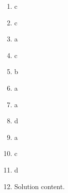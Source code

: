 \documentclass[12pt]{amsart}
\begin{document}
\begin{enumerate}[resume]
\vspace{1cm}
 \end{enumerate}\newpage\newpage{}\graphicspath{{/Users/jilan/Downloads/Randomizer/Randomizer/Sample Course/Sample Assessment/}}\begin{enumerate}\item c\item c\item a\item c\item b\item a\item a\item d\item a\item c\item d\def \a{7}\def \atwoone{1}\def \atwotwo{3}\def \atwothree{4}\def \btwothree{6}\def \sumtwothree{10}\def \diftwothree{-2}\def \bigtwothree{400}\def \powtwothree{1296}\def \logtwothree{0.7737056144690831}\def \factortwothree{209}\def \atwofour{1.4}\def \btwofour{1.17}\def \tooshorttwofour{10.1}\def \moneytwofour{10.10}\def \longertwofour{10.10000}\def \atwofive{0.12}\def \btwofive{0.12346}\def \athreeone{5}\def \bthreeone{7}\def \setthreetwo{[2, 5, 6]}\def \athreetwo{2}\def \bthreetwo{5}\def \cthreetwo{6}\def \controlthreethree{-4}\def \athreethree{1}\def \topthreethree{0}\def \athreefour{5}\def \bthreefour{4}\def \listthreefour{[1, 2, 3, 4]}\def \afourone{8}\def \bfourone{-6}\def \fracfourone{\frac{-4}{3}}\def \rootfourtwo{8}\def \simplifiedfourtwo{2 \sqrt{2}}\def \sqrtlistfourtwo{[2, 2]}\def \outfourtwo{2}\def \infourtwo{2}\def \wowfourtwo{1}\def \afourthree{0}\def \nicethreefour{3x^{2}-x^{}}\def \nastythreefour{xyz^{3}}\def \cfourthree{4}\def \dfourthree{-9}\def \infourthree{4x^{}}\def \outfourthree{-9y^{}}\def \afourfour{1597772}\def \nicefourfour{1,597,772}\def \goodfourfour{1,000,000.12345}\def \badfourfour{1,000,000.1}
\item Solution content.


\end{enumerate}
\end{document}
